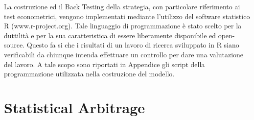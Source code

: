 \documentclass[]{article}
\begin{document}
La costruzione ed il Back Testing della strategia, con particolare riferimento ai test econometrici, vengono implementati mediante l’utilizzo del software statistico R (www.r-project.org). Tale linguaggio di programmazione è stato scelto per la duttilità e per la sua caratteristica di essere liberamente disponibile ed open-source. Questo fa si che i risultati di un lavoro di ricerca sviluppato in R siano verificabili da chiunque intenda effettuare un controllo per dare una valutazione del lavoro.
A tale scopo sono riportati in Appendice gli script della programmazione utilizzata nella costruzione del modello.

\break 

\section{Statistical Arbitrage}
\end{document}
